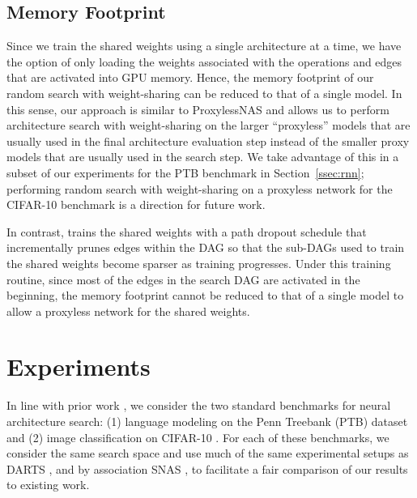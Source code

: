 \documentclass[acmlarge, nonacm]{acmart}
\begin{document}
\subsection{Memory Footprint}
Since we train the shared weights using a single architecture at a time, we have the option of only loading the weights associated with the operations and edges that are activated into GPU memory.  Hence, the memory footprint of our random search with weight-sharing can be reduced to that of a single model.  In this sense, our approach is similar to ProxylessNAS \citep{cai2018proxylessnas} and allows us to perform architecture search with weight-sharing on the larger ``proxyless'' models that are usually used in the final architecture evaluation step instead of the smaller proxy models that are usually used in the search step.  We take advantage of this in a subset of our experiments for the PTB benchmark in Section~\ref{ssec:rnn}; performing random search with weight-sharing on a proxyless network for the CIFAR-10 benchmark is a direction for future work.

In contrast, \citet{bender2018understanding} trains the shared weights with a path dropout schedule that incrementally prunes edges within the DAG so that the sub-DAGs used to train the shared weights become sparser as training progresses.  Under this training routine, since most of the edges in the search DAG are activated in the beginning, the memory footprint cannot be reduced to that of a single model to allow a proxyless network for the shared weights.

\section{Experiments}
\label{sec:exp}

In line with prior work \citep{nasRL, pham18ENAS, liu2018darts}, we consider the two standard benchmarks for neural architecture search:
(1) language modeling on the Penn Treebank (PTB) dataset \citep{ptb} and (2) image classification on CIFAR-10 \citep{cifar10data}. 
For each of these benchmarks, we consider the same search space and use much of the same experimental setups as DARTS \citep{liu2018darts}, and by association SNAS \citep{xie2018snas}, to facilitate a fair comparison of our results to existing work. 
\end{document}
